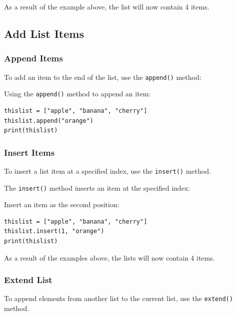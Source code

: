 \documentclass[12pt,a4paper]{article}
\newcommand{\code}[1]{%
	\colorbox{backcolour}{\lstinline{#1}}%
}
\newcommand{\lcode}[1]{%
	\lstinline{#1}%
}
\begin{document}
\begin{nbox}
	As a result of the example above, the list will now contain 4 items.
\end{nbox}
\vfill\newpage
\subsection{Add List Items}
\subsubsection{Append Items}

To add an item to the end of the list, use the \code{append()} method:

\begin{ebox}
Using the \lcode{append()} method to append an item:
	\begin{lstlisting}
thislist = ["apple", "banana", "cherry"]
thislist.append("orange")
print(thislist)
	\end{lstlisting}
\tcblower
	\begin{vercode}
	\end{vercode}
\end{ebox}
\subsubsection{Insert Items}

To insert a list item at a specified index, use the \code{insert()} method.

The \code{insert()} method inserts an item at the specified index:

\begin{ebox}
Insert an item as the second position:
	\begin{lstlisting}
thislist = ["apple", "banana", "cherry"]
thislist.insert(1, "orange")
print(thislist)
	\end{lstlisting}
\tcblower
	\begin{vercode}
	\end{vercode}
\end{ebox}

\begin{nbox}
As a result of the examples above, the lists will now contain 4 items.
\end{nbox}
\subsubsection{Extend List}
To append elements from another list to the current list, use the
\code{extend()} method.
\end{document}
